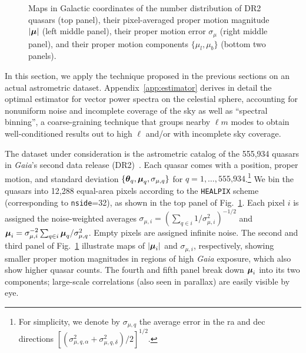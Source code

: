 \documentclass[prd,aps,twocolumn,nofootinbib,superscriptaddress,preprintnumbers,balancelastpage,longbibliography,floatfix]{revtex4-1}
\begin{document}
\begin{figure}[tbp]
\caption{Maps in Galactic coordinates of the number distribution of \Gaia DR2 quasars (top panel), their pixel-averaged proper motion magnitude $|\boldsymbol{\mathbf{\mu}}|$ (left middle panel), their proper motion error $\sigma_\mu$ (right middle panel), and their proper motion components $\lbrace \mu_l, \mu_b \rbrace$ (bottom two panels). }
\label{fig:gaia_maps}
\end{figure}

In this section, we apply the technique proposed in the previous sections on an actual astrometric dataset. Appendix~\ref{app:estimator} derives in detail the optimal estimator for vector power spectra on the celestial sphere, accounting for nonuniform noise and incomplete coverage of the sky as well as ``spectral binning'', a coarse-graining technique that groups nearby $\ell m$ modes to obtain well-conditioned results out to high $\ell$ and/or with incomplete sky coverage. 

The dataset under consideration is the astrometric catalog of the 555,934 quasars in \textit{Gaia}'s second data release (DR2)~\cite{Prusti:2016bjo,Brown:2018dum,lindegren2018gaia}. Each quasar comes with a position, proper motion, and standard deviation $\lbrace \boldsymbol{\mathbf{\theta}}_q, \boldsymbol{\mathbf{\mu}}_q, \sigma_{\mu,q} \rbrace$ for $q = 1, \dots, \text{555,934}$.\footnote{For simplicity, we denote by $\sigma_{\mu,q}$ the average error in the ra and dec directions $[(\sigma_{\mu,q,\alpha}^2 +\sigma_{\mu,q,\delta}^2 )/2]^{1/2}$.} We bin the quasars into 12,288 equal-area pixels according to the \texttt{HEALPIX} scheme (corresponding to \texttt{nside}=32), as shown in the top panel of Fig.~\ref{fig:gaia_maps}. Each pixel $i$ is assigned the noise-weighted averages $\sigma_{\mu,i} = (\sum_{q \in i} 1/\sigma_{\mu,i}^2)^{-1/2}$ and $\boldsymbol{\mathbf{\mu}}_i = \sigma_{\mu,i}^{-2} \sum_{q \in i} \boldsymbol{\mathbf{\mu}}_q / \sigma_{\mu,q}^2$. Empty pixels are assigned infinite noise. The second and third panel of Fig.~\ref{fig:gaia_maps} illustrate maps of $|\boldsymbol{\mathbf{\mu}}_i|$ and $\sigma_{\mu,i}$, respectively, showing smaller proper motion magnitudes in regions of high \textit{Gaia} exposure, which also show higher quasar counts. The fourth and fifth panel break down $\boldsymbol{\mathbf{\mu}}_i$ into its two components; large-scale correlations (also seen in parallax) are easily visible by eye.
\end{document}
